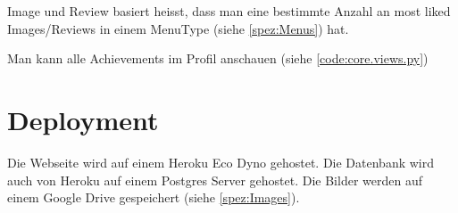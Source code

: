 Image und Review basiert heisst, dass man eine bestimmte Anzahl an most liked
Images/Reviews in einem MenuType (siehe \ref{spez:Menus}) hat.

Man kann alle Achievements im Profil anschauen (siehe \ref{code:core.views.py})

\section{Deployment} \label{spez:Deployment}

Die Webseite wird auf einem Heroku Eco Dyno gehostet. Die Datenbank wird auch
von Heroku auf einem Postgres Server gehostet. Die Bilder werden auf einem
Google Drive gespeichert (siehe \ref{spez:Images}).
